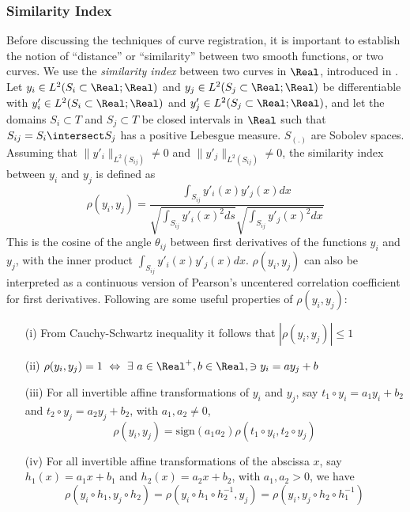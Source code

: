 \subsubsection{Similarity Index} \label{Sec7_Similarity}
Before discussing the techniques of curve registration, it is important to establish the notion of ``distance'' or ``similarity'' between two smooth functions, or two curves. We use the {\emph{similarity index}} between two curves in $\Real$, introduced in \cite{Sangalli_etal_2009_JASA}. Let $y_i \in L^2(S_i \subset \Real; \Real)$ and $y_j \in L^2(S_j \subset \Real; \Real)$ be differentiable with $y'_i \in L^2(S_i \subset \Real; \Real)$ and $y'_j \in L^2(S_j \subset \Real; \Real)$, and let the domains $S_i \subset T$ and $S_j  \subset T$ be closed intervals in $\Real$ such that $S_{ij} = S_i \intersect S_j$ has a positive Lebesgue measure. $S_{(.)}$ are Sobolev spaces. Assuming that $\|y'_i\|_{L^2(S_{ij})} \ne 0$ and $\|y'_j\|_{L^2(S_{ij})} \ne 0$, the similarity index between $y_i$ and $y_j$ is defined as
\begin{equation}
\rho(y_i, y_j) = \frac{\int _{S_{ij}}y'_i(x)y'_j(x) dx}{\sqrt{\int _{S_{ij}}y'_i(x)^2 ds}\sqrt{ \int _{S_{ij}} y'_j(x)^2 dx}}
\label{eq:Sec7_Similarity}
\end{equation}
This is the cosine of the angle $\theta_{ij}$ between first derivatives of the functions $y_i$ and $y_j$, with the inner product $\int _{S_{ij}}y'_i(x)y'_j(x) dx$.  $\rho(y_i, y_j)$ can also be interpreted as a continuous version of Pearson’s uncentered correlation coefficient for first derivatives. Following are some useful properties of $\rho(y_i, y_j)$:
\begin{enumerate}
\item[(i)] From Cauchy-Schwartz inequality it follows that $|\rho(y_i, y_j)| \leq 1$
\item[(ii)] $\rho(y_i, y_j) = 1 \ \Leftrightarrow \ \exists \ a \in \Real^{+}, b \in \Real, \ni y_i = ay_j + b $
\item[(iii)] For all invertible affine transformations of $y_i$ and $y_j$, say $t_1 \circ y_i = a_1y_i + b_2$ and $t_2 \circ y_j = a_2y_j + b_2$, with $a_1, a_2 \ne 0$, 
\[ \rho(y_i, y_j) = \text{sign}(a_1 a_2)\rho(t_1 \circ y_i, t_2 \circ y_j)\]
\item[(iv)] For all invertible affine transformations of the abscissa $x$, say $h_1(x) = a_1 x + b_1$ and $h_2(x) = a_2 x + b_2$, with $a_1, a_2 > 0$, we have
\[ \rho(y_i \circ h_1, y_j \circ h_2) = \rho(y_i \circ h_1 \circ h_2^{-1}, y_j) = \rho(y_i , y_j \circ h_2 \circ h_1^{-1}) \]
\end{enumerate}

